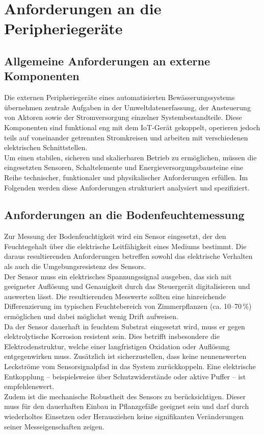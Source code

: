 \section{Anforderungen an die Peripheriegeräte}

\subsection{Allgemeine Anforderungen an externe Komponenten}

Die externen Peripheriegeräte eines automatisierten Bewässerungssystems übernehmen zentrale Aufgaben in der Umweltdatenerfassung, der Ansteuerung von Aktoren sowie der Stromversorgung einzelner Systembestandteile. Diese Komponenten sind funktional eng mit dem IoT-Gerät gekoppelt, operieren jedoch teils auf voneinander getrennten Stromkreisen und arbeiten mit verschiedenen elektrischen Schnittstellen.
\\
Um einen stabilen, sicheren und skalierbaren Betrieb zu ermöglichen, müssen die eingesetzten Sensoren, Schaltelemente und Energieversorgungsbausteine eine Reihe technischer, funktionaler und physikalischer Anforderungen erfüllen. Im Folgenden werden diese Anforderungen strukturiert analysiert und spezifiziert.

\subsection{Anforderungen an die Bodenfeuchtemessung}

Zur Messung der Bodenfeuchtigkeit wird ein Sensor eingesetzt, der den Feuchtegehalt über die elektrische Leitfähigkeit eines Mediums bestimmt. Die daraus resultierenden Anforderungen betreffen sowohl das elektrische Verhalten als auch die Umgebungsresistenz des Sensors.
\\
Der Sensor muss ein elektrisches Spannungssignal ausgeben, das sich mit geeigneter Auflösung und Genauigkeit durch das Steuergerät digitalisieren und auswerten lässt. Die resultierenden Messwerte sollten eine hinreichende Differenzierung im typischen Feuchtebereich von Zimmerpflanzen (ca. 10–70\,\%) ermöglichen und dabei möglichst wenig Drift aufweisen.
\\
Da der Sensor dauerhaft in feuchtem Substrat eingesetzt wird, muss er gegen elektrolytische Korrosion resistent sein. Dies betrifft insbesondere die Elektrodenstruktur, welche einer langfristigen Oxidation oder Auflösung entgegenwirken muss. Zusätzlich ist sicherzustellen, dass keine nennenswerten Leckströme vom Sensorsignalpfad in das System zurückkoppeln. Eine elektrische Entkopplung – beispielsweise über Schutzwiderstände oder aktive Puffer – ist empfehlenswert.
\\
Zudem ist die mechanische Robustheit des Sensors zu berücksichtigen. Dieser muss für den dauerhaften Einbau in Pflanzgefäße geeignet sein und darf durch wiederholtes Einsetzen oder Herausziehen keine signifikanten Veränderungen seiner Messeigenschaften zeigen.


